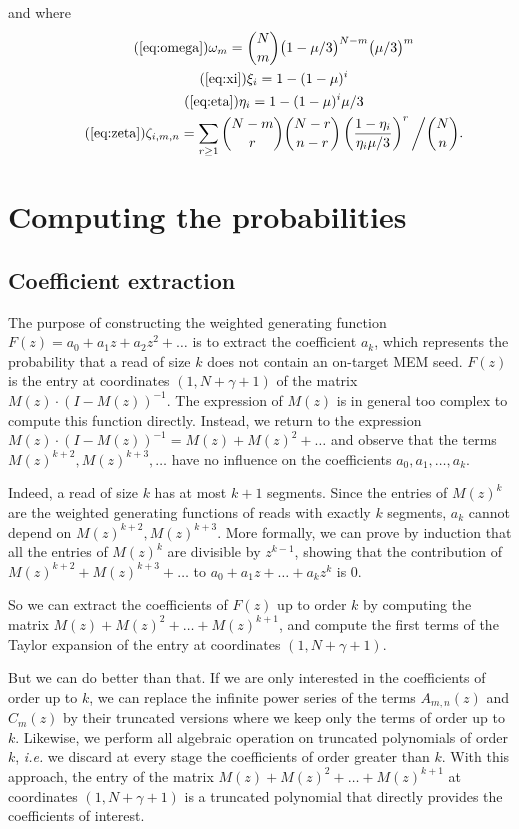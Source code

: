 \documentclass{article}
\begin{document}
and where
\begin{gather}
\tag{\ref{eq:omega}}
\omega_m = {N \choose m} \big(1 - \mu/3\big)^{N-m} \big(\mu/3\big)^m \\
\tag{\ref{eq:xi}}
\xi_i = 1-(1-\mu)^i \\
\tag{\ref{eq:eta}}
\eta_i = 1-(1-\mu)^i\mu/3 \\
\tag{\ref{eq:zeta}}
\zeta_{i,m,n} = \sum_{r\geq1}
{N-m \choose r} {N-r \choose n-r}
\left( \frac{1-\eta_i}{\eta_i \mu/3} \right)^r \bigg/ {N \choose n}.
\end{gather}


\section{Computing the probabilities}

\subsection{Coefficient extraction}

The purpose of constructing the weighted generating function $F(z) = a_0 +
a_1z + a_2z^2 + \ldots$ is to extract the coefficient $a_k$, which
represents the probability that a read of size $k$ does not contain an
on-target MEM seed. $F(z)$ is the entry at coordinates $(1,N+\gamma+1)$ of
the matrix $M(z) \cdot (I-M(z))^{-1}$. The expression of $M(z)$ is in
general too complex to compute this function directly. Instead, we return
to the expression $M(z) \cdot (I-M(z))^{-1} = M(z) + M(z)^2 + \ldots$ and
observe that the terms $M(z)^{k+2}, M(z)^{k+3}, \ldots$ have no influence
on the coefficients $a_0, a_1, \ldots, a_k$.

Indeed, a read of size $k$ has at most $k+1$ segments. Since the entries
of $M(z)^k$ are the weighted generating functions of reads with exactly
$k$ segments, $a_k$ cannot depend on $M(z)^{k+2}, M(z)^{k+3}$. More
formally, we can prove by induction that all the entries of $M(z)^k$ are
divisible by $z^{k-1}$, showing that the contribution of $M(z)^{k+2} +
M(z)^{k+3} + \ldots$ to $a_0 + a_1z + \ldots +a_kz^k$ is $0$.

So we can extract the coefficients of $F(z)$ up to order $k$ by computing
the matrix $M(z) + M(z)^2 + \ldots + M(z)^{k+1}$, and compute the first
terms of the Taylor expansion of the entry at coordinates
$(1,N+\gamma+1)$.

But we can do better than that. If we are only interested in the
coefficients of order up to $k$, we can replace the infinite power series
of the terms $A_{m,n}(z)$ and $C_m(z)$ by their truncated versions where
we keep only the terms of order up to $k$. Likewise, we perform all
algebraic operation on truncated polynomials of order $k$, \textit{i.e.}
we discard at every stage the coefficients of order greater than $k$. With
this approach, the entry of the matrix $M(z) + M(z)^2 + \ldots +
M(z)^{k+1}$ at coordinates $(1,N+\gamma+1)$ is a truncated polynomial that
directly provides the coefficients of interest.
\end{document}
